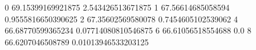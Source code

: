 0 69.15399169921875 2.543426513671875
1 67.56614685058594 0.9555816650390625
2 67.35602569580078 0.7454605102539062
4 66.68770599365234 0.07714080810546875
6 66.61056518554688 0.0
8 66.6207046508789 0.01013946533203125

